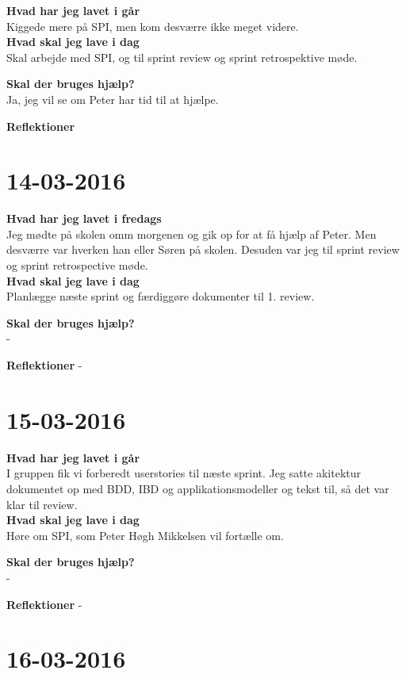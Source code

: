\documentclass{article}
\begin{document}
	\textbf{Hvad har jeg lavet i går}\\
	Kiggede mere på SPI, men kom desværre ikke meget videre.\\
	
	\textbf{Hvad skal jeg lave i dag}\\
	Skal arbejde med SPI, og til sprint review og sprint retrospektive møde.     
	
	\textbf{Skal der bruges hjælp?}\\
	Ja, jeg vil se om Peter har tid til at hjælpe.
	
	\textbf{Reflektioner}
	
	
	\section{14-03-2016}
	
	\textbf{Hvad har jeg lavet i fredags}\\
	Jeg mødte på skolen omm morgenen og gik op for at få hjælp af Peter. Men desværre var hverken han eller Søren på skolen.
	Desuden var jeg til sprint review og sprint retrospective møde.\\
	
	\textbf{Hvad skal jeg lave i dag}\\
	Planlægge næste sprint og færdiggøre dokumenter til 1. review.     
	
	\textbf{Skal der bruges hjælp?}\\
	-
	
	\textbf{Reflektioner}
	-
	
	\section{15-03-2016}
	
	\textbf{Hvad har jeg lavet i går}\\
	I gruppen fik vi forberedt userstories til næste sprint. Jeg satte akitektur dokumentet op med BDD, IBD og applikationsmodeller og tekst til, så det var klar til review. \\
	
	\textbf{Hvad skal jeg lave i dag}\\
	Høre om SPI, som Peter Høgh Mikkelsen vil fortælle om.     
	
	\textbf{Skal der bruges hjælp?}\\
	-
	
	\textbf{Reflektioner}
	-
	
	\section{16-03-2016}
	
\end{document}
